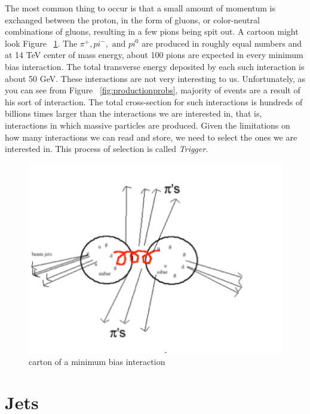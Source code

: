 The most common thing to occur is that a small amount of momentum is exchanged between the proton, in the form of gluons, or color-neutral combinations of gluons, resulting in a few pions being spit out.  A cartoon might look Figure ~\ref{fig:minbias}. The $\pi^+, pi^-, \text{ and } pi^0 $ are produced in roughly equal numbers and at 14 TeV center of mass energy, about 100 pions are expected in every minimum bias interaction. The total transverse energy deposited by each such interaction is about 50 GeV.  These interactions are not very interesting to us. Unfortunately, as you can see from Figure ~\ref{fig:productionprobs}, majority of events are a result of his sort of interaction. The total cross-section for such interactions is hundreds of billions times larger than the interactions we are interested in, that is, interactions in which massive particles are produced. Given the limitations on how many interactions we can read and store, we need to select the ones we are interested in. This process of selection is called {\it Trigger}. 

\begin{figure}[h]
\centering\includegraphics[scale=0.5]{./protonprotoncollisions/Pictures/fig6.pdf}
\caption{carton of a minimum bias interaction}
\label{fig:minbias}
\end{figure}

\section{Jets}

